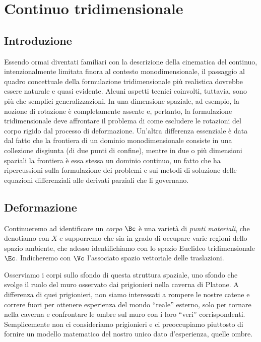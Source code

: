 \chapter{Continuo tridimensionale}


\section{Introduzione}
Essendo ormai diventati familiari con la descrizione  della cinematica del continuo, intenzionalmente limitata finora al contesto monodimensionale, il passaggio al quadro concettuale della formulazione tridimensionale più realistica dovrebbe essere naturale e quasi evidente. Alcuni aspetti tecnici coinvolti, tuttavia, sono più che semplici generalizzazioni. In una dimensione spaziale, ad esempio, la nozione di rotazione è completamente assente e, pertanto, la formulazione tridimensionale deve affrontare il problema di come escludere le rotazioni del corpo rigido dal processo di deformazione. Un'altra differenza essenziale è data dal fatto che la frontiera di un dominio monodimensionale consiste in una collezione disgiunta (di due punti di confine), mentre in due o più dimensioni spaziali la frontiera è essa stessa un dominio continuo, un fatto che ha ripercussioni sulla formulazione dei problemi  e sui metodi di soluzione delle equazioni differenziali alle derivati parziali che li governano.


\section{Deformazione}

Continueremo ad identificare un \textit{corpo}  $\Bc$ è una varietà di \textit{punti materiali}, che denotiamo con $X$ e supporremo che sia  in grado di occupare varie  regioni dello spazio ambiente, che adesso identifichiamo con lo spazio Euclideo tridimensionale $\Ec$. Indicheremo con $\Vc$ l'associato spazio vettoriale delle traslazioni.

Osserviamo i corpi sullo sfondo di questa struttura spaziale,  uno sfondo che svolge il ruolo del muro osservato dai prigionieri nella caverna di Platone. A differenza di quei prigionieri, non siamo interessati a rompere le nostre catene e correre fuori per ottenere esperienza del mondo ``reale'' esterno, solo per tornare nella caverna e confrontare le ombre sul muro con i loro ``veri'' corrispondenti. Semplicemente non ci consideriamo prigionieri e ci  preoccupiamo piuttosto di fornire un modello matematico del nostro unico dato d'esperienza, quelle ombre.

